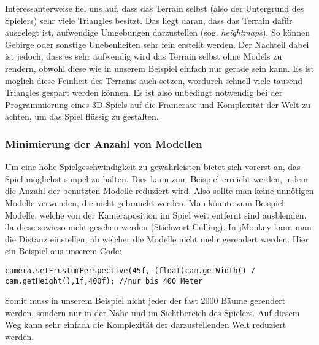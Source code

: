 Interessanterweise fiel uns auf, dass das Terrain selbst (also der Untergrund des Spielers) sehr viele Triangles besitzt. Das liegt daran, dass das Terrain dafür ausgelegt ist, aufwendige Umgebungen darzustellen (sog. \emph{heightmaps}). So können Gebirge oder sonstige Unebenheiten sehr fein erstellt werden. Der Nachteil dabei ist jedoch, dass es sehr aufwendig wird das Terrain selbst ohne Models zu rendern, obwohl diese wie in unserem Beispiel einfach nur gerade sein kann. Es ist möglich diese Feinheit des Terrains auch setzen, wordurch schnell viele tausend Triangles gespart werden können. Es ist also unbedingt notwendig bei der Programmierung eines 3D-Spiels auf die Framerate und Komplexität der Welt zu achten, um das Spiel flüssig zu gestalten.



\subsubsection{Minimierung der Anzahl von Modellen}
Um eine hohe Spielgeschwindigkeit zu gewährleisten bietet sich vorerst an, das Spiel möglichst simpel zu halten. Dies kann zum Beispiel erreicht werden, indem die Anzahl der benutzten Modelle reduziert wird. Also sollte man keine unnötigen Modelle verwenden, die nicht gebraucht werden. Man könnte zum Beispiel Modelle, welche von der Kameraposition im Spiel weit entfernt sind ausblenden, da diese sowieso nicht gesehen werden (Stichwort Culling). In jMonkey kann man die Distanz einstellen, ab welcher die Modelle nicht mehr gerendert werden. Hier ein Beispiel aus unserem Code:


\begin{lstlisting}
camera.setFrustumPerspective(45f, (float)cam.getWidth() / cam.getHeight(),1f,400f); //nur bis 400 Meter
\end{lstlisting}


Somit muss in unserem Beispiel nicht jeder der fast 2000 Bäume gerendert werden, sondern nur in der Nähe und im Sichtbereich des Spielers. Auf diesem Weg kann sehr einfach die Komplexität der darzustellenden Welt reduziert werden.

